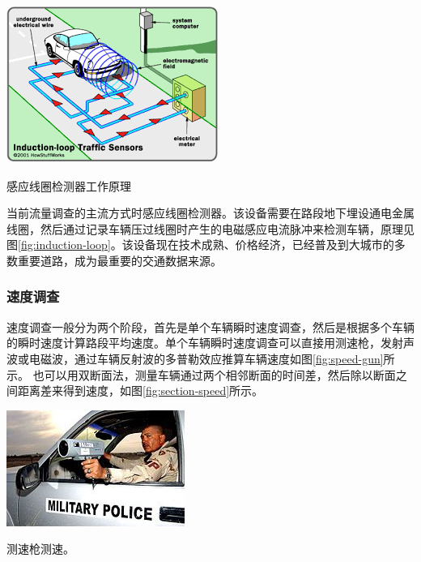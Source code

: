 \begin{marginfigure}
    \includegraphics[width=\linewidth]{images/induction-loop-sensor.png}
    \caption{感应线圈检测器工作原理}
    \label{fig:induction-loop}
\end{marginfigure}

当前流量调查的主流方式时感应线圈检测器。该设备需要在路段地下埋设通电金属线圈，然后通过记录车辆压过线圈时产生的电磁感应电流脉冲来检测车辆，原理见图\ref{fig:induction-loop}。该设备现在技术成熟、价格经济，已经普及到大城市的多数重要道路，成为最重要的交通数据来源。

\subsubsection{速度调查}

速度调查一般分为两个阶段，首先是单个车辆瞬时速度调查，然后是根据多个车辆的瞬时速度计算路段平均速度。单个车辆瞬时速度调查可以直接用测速枪，发射声波或电磁波，通过车辆反射波的多普勒效应推算车辆速度如图\ref{fig:speed-gun}所示。
也可以用双断面法，测量车辆通过两个相邻断面的时间差，然后除以断面之间距离差来得到速度，如图\ref{fig:section-speed}所示。

\begin{marginfigure}
    \includegraphics[width=\linewidth]{images/speed-gun.jpg}
    \caption{测速枪测速。}
    \label{fig:speed-gun}
\end{marginfigure}

